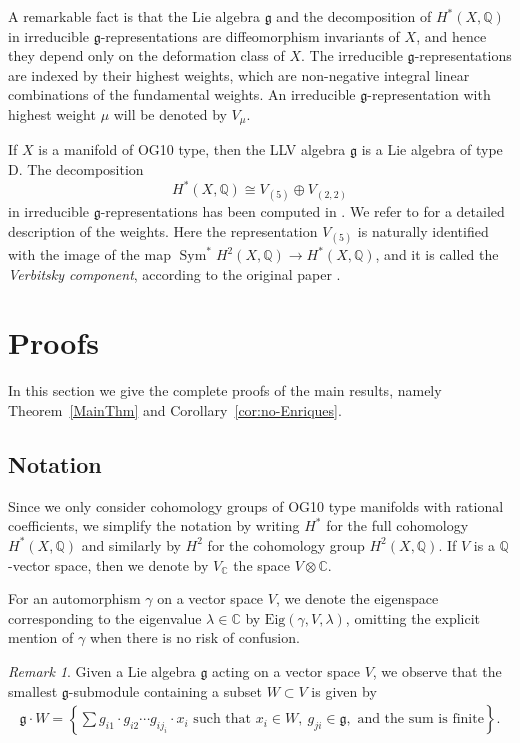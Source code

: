 \documentclass[a4paper,11pt]{amsart}
\newcommand{\Q}{{\mathbb Q}}
\newcommand{\Eig}{{\mathrm{Eig}}}
\newcommand{\bbQ}{{\mathbb Q}}
\newcommand{\kg}{{\mathfrak g}}
\DeclareMathOperator{\Sym}{Sym}
\theoremstyle{plain}
\theoremstyle{remark}
\newtheorem{remark}[subsection]{Remark}
\begin{document}
A remarkable fact is that the Lie algebra \(\mathfrak{g}\) and the decomposition of \(H^*(X,\bbQ)\) in irreducible \(\mathfrak{g}\)-representations are diffeomorphism invariants of \(X\), and hence they depend only on the deformation class of \(X\). The irreducible \(\mathfrak{g}\)-representations are indexed by their highest weights, which are
non-negative integral linear combinations of the fundamental weights. An irreducible \(\mathfrak{g}\)-representation with highest weight \(\mu\) will be denoted by \(V_\mu\).  

If \(X\) is a manifold of OG10 type, then the LLV algebra \(\mathfrak{g}\) is a Lie algebra of type D. The decomposition 
\[H^*(X,\bbQ)\cong V_{(5)}\oplus V_{(2,2)}\]
in irreducible \(\mathfrak{g}\)-representations has been computed in \cite[Theorem 1.2 (iv)]{GKLR}. We refer to \cite[Appendix A.2]{GKLR} for a detailed description of the weights. Here the representation \(V_{(5)}\) is naturally identified with the image of the map \(\Sym^* H^2(X,\bbQ)\to H^*(X,\bbQ)\), and it is called the \textit{Verbitsky component}, according to the original paper \cite{Ver90}.

\section{Proofs}
In this section we give the complete proofs of the main results, namely Theorem~\ref{MainThm} and Corollary~\ref{cor:no-Enriques}.
\subsection*{Notation}
Since we only consider cohomology groups of OG10 type manifolds with rational coefficients, we simplify the notation by writing $H^*$ for the full cohomology $H^*(X, \Q)$ and similarly by $H^2$ for the cohomology group $H^2(X, \mathbb Q)$. If \(V\) is a \(\mathbb{Q}\)-vector space, then we denote by \(V_{\mathbb{C}}\) the space \(V\otimes\mathbb{C}\).

For an automorphism $\gamma$ on a vector space \(V\), we denote the eigenspace corresponding to the eigenvalue $\lambda\in\mathbb{C}$ by $\Eig(\gamma,V, \lambda)$, omitting the explicit mention of $\gamma$ when there is no risk of confusion.

\begin{remark}
    Given a Lie algebra $\kg$ acting on a vector space $V$, we observe that the smallest $\kg$-submodule containing a subset $W\subset V$ is given by
    \begin{align*}
        \kg \cdot W = \left\{ \sum g_{i1}\cdot g_{i2} \cdots g_{ij_i}\cdot x_i \mbox{ such that } x_i\in W,\ g_{ji}\in\kg, \mbox{ and the sum is finite}\right\}.
    \end{align*}
\end{remark}
\end{document}

